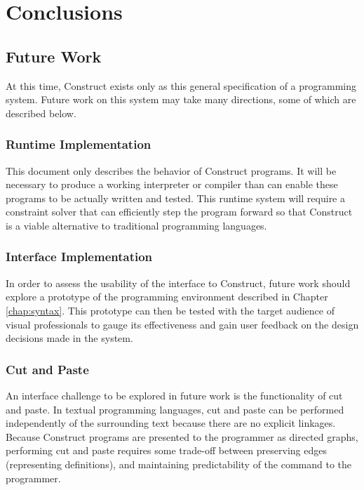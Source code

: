 \documentclass[twoside,11pt]{report}
\begin{document}
\chapter{Conclusions}
\label{chap:conclusions}

\section{Future Work}

At this time, Construct exists only as this general specification of a programming system. 
Future work on this system may take many directions, some of which are described below.

\subsection{Runtime Implementation}

This document only describes the behavior of Construct programs. 
It will be necessary to produce a working interpreter or compiler than can enable these programs to be actually written and tested. 
This runtime system will require a constraint solver that can efficiently step the program forward so that Construct is a viable alternative to traditional programming languages.

\subsection{Interface Implementation}

In order to assess the usability of the interface to Construct, future work should explore a prototype of the programming environment described in Chapter \ref{chap:syntax}.
This prototype can then be tested with the target audience of visual professionals to gauge its effectiveness and gain user feedback on the design decisions made in the system.

\subsection{Cut and Paste}

An interface challenge to be explored in future work is the functionality of cut and paste. 
In textual programming languages, cut and paste can be performed independently of the surrounding text because there are no explicit linkages.
Because Construct programs are presented to the programmer as directed graphs, performing cut and paste requires some trade-off between preserving edges (representing definitions), and maintaining predictability of the command to the programmer.
\end{document}
